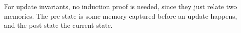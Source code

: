 For update invariants,
no induction proof is needed,
since they just relate two
memories.  The pre-state is some memory captured before an update happens, and
the post state the current state.






